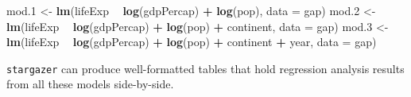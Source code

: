 \documentclass[
]{book}
\newenvironment{Shaded}{\begin{snugshade}}{\end{snugshade}}
\newcommand{\DataTypeTok}[1]{\textcolor[rgb]{0.13,0.29,0.53}{#1}}
\newcommand{\FloatTok}[1]{\textcolor[rgb]{0.00,0.00,0.81}{#1}}
\newcommand{\KeywordTok}[1]{\textcolor[rgb]{0.13,0.29,0.53}{\textbf{#1}}}
\newcommand{\NormalTok}[1]{#1}
\newcommand{\OperatorTok}[1]{\textcolor[rgb]{0.81,0.36,0.00}{\textbf{#1}}}
\newcommand{\StringTok}[1]{\textcolor[rgb]{0.31,0.60,0.02}{#1}}
\begin{document}
\begin{Shaded}
\begin{Highlighting}[]
\NormalTok{mod}\FloatTok{.1}\NormalTok{ <-}\StringTok{ }\KeywordTok{lm}\NormalTok{(lifeExp }\OperatorTok{~}\StringTok{ }\KeywordTok{log}\NormalTok{(gdpPercap) }\OperatorTok{+}\StringTok{ }\KeywordTok{log}\NormalTok{(pop), }\DataTypeTok{data =}\NormalTok{ gap)}
\NormalTok{mod}\FloatTok{.2}\NormalTok{ <-}\StringTok{ }\KeywordTok{lm}\NormalTok{(lifeExp }\OperatorTok{~}\StringTok{ }\KeywordTok{log}\NormalTok{(gdpPercap) }\OperatorTok{+}\StringTok{ }\KeywordTok{log}\NormalTok{(pop) }\OperatorTok{+}\StringTok{ }\NormalTok{continent, }\DataTypeTok{data =}\NormalTok{ gap)}
\NormalTok{mod}\FloatTok{.3}\NormalTok{ <-}\StringTok{ }\KeywordTok{lm}\NormalTok{(lifeExp }\OperatorTok{~}\StringTok{ }\KeywordTok{log}\NormalTok{(gdpPercap) }\OperatorTok{+}\StringTok{ }\KeywordTok{log}\NormalTok{(pop) }\OperatorTok{+}\StringTok{ }\NormalTok{continent }\OperatorTok{+}\StringTok{ }\NormalTok{year, }\DataTypeTok{data =}\NormalTok{ gap)}
\end{Highlighting}
\end{Shaded}

\texttt{stargazer} can produce well-formatted tables that hold regression analysis results from all these models side-by-side.
\end{document}
